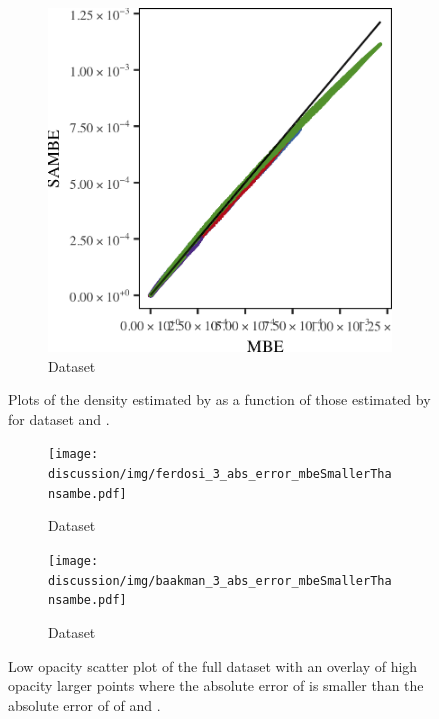 \begin{figure}
\begin{subfigure}{0.23\textwidth}
			\includegraphics[keepaspectratio=true, width=\textwidth, height=0.23\textheight]{discussion/img/baakman_3_120000_mbe_sambe.png}
			\caption{Dataset \baakmanThree}
			\label{fig:discussion:multisphere:mbevssambe:baakman3}
		\end{subfigure}	
		\caption{Plots of the density estimated by \sambe as a function of those estimated by \mbe for dataset %
			\ferdosiTwo and %
			\baakmanTwo.
		}
		\label{fig:discussion:multisphere:four:mbevssambe}
	\end{figure}

	\begin{figure}
		\centering
		\begin{subfigure}{0.23\textwidth}
			\centering
			\texttt{[image: discussion/img/ferdosi\_3\_abs\_error\_mbeSmallerThansambe.pdf]}
			\caption{Dataset \ferdosiThree}
			\label{fig:discussion:multisphere:mbeLoweError:ferdosi3}
		\end{subfigure}
		\begin{subfigure}{0.23\textwidth}
			\centering
			\texttt{[image: discussion/img/baakman\_3\_abs\_error\_mbeSmallerThansambe.pdf]}
			\caption{Dataset \baakmanThree}
			\label{fig:discussion:multisphere:mbeLoweError:baakman3}
		\end{subfigure}	
		\caption{Low opacity scatter plot of the full dataset with an overlay of high opacity larger points where the absolute error of \mbe is smaller than the absolute error of \sambe of %
			\ferdosiTwo and %
			\baakmanTwo.
		}
		\label{fig:discussion:multisphere:four:mbeLoweError}
	\end{figure}	